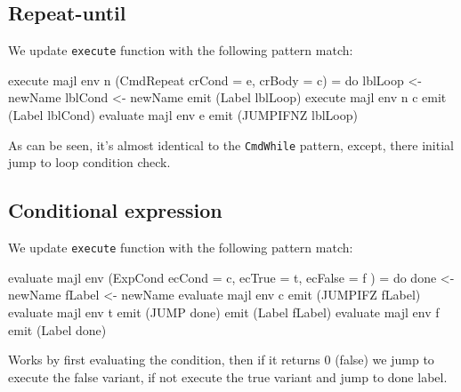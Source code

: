 \documentclass{article}
\begin{document}
\subsection{Repeat-until}
\begin{flushleft}
We update \texttt{execute} function with the following pattern match:
\end{flushleft}
\begin{code}
execute majl env n (CmdRepeat {crCond = e, crBody = c}) = do
    lblLoop <- newName
    lblCond <- newName
    emit (Label lblLoop)
    execute majl env n c
    emit (Label lblCond)
    evaluate majl env e
    emit (JUMPIFNZ lblLoop)
\end{code}
\begin{flushleft}
As can be seen, it's almost identical to the \texttt{CmdWhile} pattern, except, there initial jump to loop condition check.
\end{flushleft}

\subsection{Conditional expression}

\begin{flushleft}
We update \texttt{execute} function with the following pattern match:
\end{flushleft}
\begin{code}
evaluate majl env (ExpCond { ecCond = c, ecTrue = t, ecFalse = f }) = do
    done <- newName
    fLabel <- newName
    evaluate majl env c
    emit (JUMPIFZ fLabel)
    evaluate majl env t
    emit (JUMP done)
    emit (Label fLabel)
    evaluate majl env f
    emit (Label done)
\end{code}
\begin{flushleft}
Works by first evaluating the condition, then if it returns 0 (false) we jump to execute the false variant, if not execute the true variant and jump to done label.
\end{flushleft}
\end{document}

